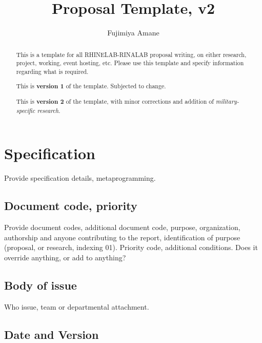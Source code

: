 \documentclass[10pt,a4paper]{article}
\title{\textbf{Proposal Template}, v2} %
\author{Fujimiya Amane} %
\affiliation{} %
\begin{document}
\maketitle

\begin{abstract}
    \noindent
    This is a template for all RHINELAB-RINALAB proposal writing, on either research, project, working, event hosting, etc. Please use this template and specify information regarding what is required.
    
    This is \textbf{version 1} of the template. Subjected to change. 

    This is \textbf{version 2} of the template, with minor corrections and addition of \textit{military-specific research}. 

\end{abstract}

\vspace{2.5cm}



\thispagestyle{firstpage}

\pagebreak


\newgeometry{} %

\section{Specification}
\label{sec:spec}

Provide specification details, metaprogramming. 

\subsection{Document code, priority}

Provide document codes, additional document code, purpose, organization, authorship and anyone contributing to the report, identification of purpose (proposal, or research, indexing 01). Priority code, additional conditions. Does it override anything, or add to anything?

\subsection{Body of issue}

Who issue, team or departmental attachment. 

\subsection{Date and Version}
\end{document}
